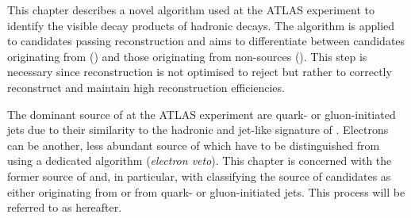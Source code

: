 This chapter describes a novel algorithm used at the ATLAS experiment to
identify the visible decay products of hadronic \taulepton decays. The algorithm
is applied to \tauhadvis candidates passing \tauhadvis reconstruction and aims
to differentiate between candidates originating from \tauhad (\truetauhadvis)
and those originating from non-\tauhad sources (\faketauhadvis). This step is
necessary since \tauhadvis reconstruction is not optimised to reject
\faketauhadvis but rather to correctly reconstruct \truetauhadvis and maintain
high \tauhadvis reconstruction efficiencies.

The dominant source of \faketauhadvis at the ATLAS experiment are
quark- or gluon-initiated jets due to their similarity to the hadronic
and jet-like signature of \tauhadvis. Electrons can be another, less
abundant source of \faketauhadvis which have to be distinguished from
\truetauhadvis using a dedicated algorithm (\emph{electron
  veto}). This chapter is concerned with the former source of
\faketauhadvis and, in particular, with classifying the source of
\tauhadvis candidates as either originating from \tauhad or from
quark- or gluon-initiated jets. This process will be referred to as
\tauid hereafter.

